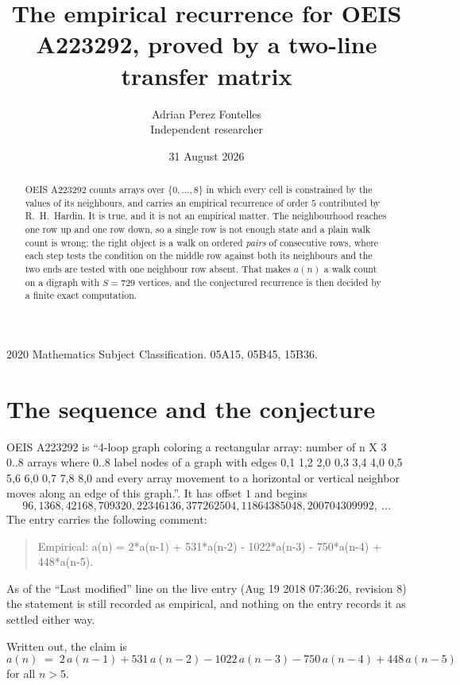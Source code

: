 \documentclass[11pt,a4paper]{article}
\title{The empirical recurrence for OEIS A223292, proved by a two-line transfer matrix}
\author{Adrian Perez Fontelles\\ \small Independent researcher}
\date{31 August 2026}
\theoremstyle{plain}
\theoremstyle{definition}
\begin{document}
\maketitle

\begin{abstract}
OEIS A223292 counts arrays over $\{0,\dots,8\}$ in which every cell is constrained by the
values of its neighbours, and carries an empirical recurrence of order $5$ contributed
by R.~H.~Hardin. It is true, and it is not an empirical matter. The neighbourhood reaches one
row up and one row down, so a single row is not enough state and a plain walk count
is wrong; the right object is a walk on ordered \emph{pairs} of consecutive rows, where
each step tests the condition on the middle row against both its neighbours and the two
ends are tested with one neighbour row absent. That makes $a(n)$ a walk count on a digraph
with $S=729$ vertices, and the conjectured recurrence is then decided by a finite exact
computation.
\end{abstract}

\noindent\small 2020 Mathematics Subject Classification. 05A15, 05B45, 15B36.\normalsize

\section{The sequence and the conjecture}

OEIS A223292 is ``4-loop graph coloring a rectangular array: number of n X 3 0..8 arrays where 0..8 label nodes of a graph with edges 0,1 1,2 2,0 0,3 3,4 4,0 0,5 5,6 6,0 0,7 7,8 8,0 and every array movement to a horizontal or vertical neighbor moves along an edge of this graph.''. It has offset $1$ and begins
\[
96, 1368, 42168, 709320, 22346136, 377262504, 11864385048, 200704309992,\ \dots
\]
The entry carries the following comment:
\begin{quote}\small
Empirical: a(n) = 2*a(n-1) + 531*a(n-2) - 1022*a(n-3) - 750*a(n-4) + 448*a(n-5).
\end{quote}
As of the ``Last modified'' line on the live entry (Aug 19 2018 07:36:26, revision 8) the statement is
still recorded as empirical, and nothing on the entry records it as settled either way.

Written out, the claim is
\begin{equation}\label{eq:conj}
a(n)\;=\;2\,a(n-1) + 531\,a(n-2) - 1022\,a(n-3) - 750\,a(n-4) + 448\,a(n-5)
\end{equation}
for all $n>5$.
\end{document}
